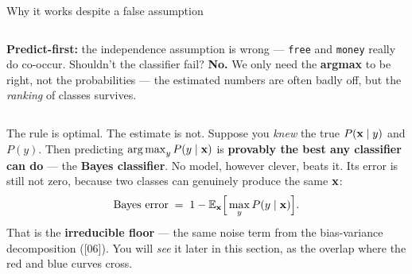 \documentclass[aspectratio=169]{beamer}
\begin{document}
\begin{frame}{Why it works despite a false assumption}
  \begin{columns}[T]
    \textbf{Predict-first:} the independence assumption is wrong --- \texttt{free} and
    \texttt{money} really do co-occur. Shouldn't the classifier fail?
    \pause
    \vskip 4pt
    \textbf{No.} We only need the \textbf{argmax} to be right, not the probabilities --- the
    estimated numbers are often badly off, but the \emph{ranking} of classes survives.
  \end{columns}
  \vfill
\end{frame}

\begin{frame}{The rule is optimal. The estimate is not.}
  Suppose you \emph{knew} the true $P(\mathbf{x}\mid y)$ and $P(y)$. Then predicting
  $\mathop{\mathrm{arg\,max}}_y P(y\mid\mathbf{x})$ is \textbf{provably the best any classifier can do} --- the
  \textbf{Bayes classifier}. No model, however clever, beats it.
  \vskip 3pt
  Its error is still not zero, because two classes can genuinely produce the same $\mathbf{x}$:
  \[
    \text{Bayes error} \;=\; 1 - \mathbb{E}_{\mathbf{x}}\Big[\max_y P(y\mid\mathbf{x})\Big].
  \]
  That is the \textbf{irreducible floor} --- the same noise term from the bias-variance
  decomposition ([06]). You will \emph{see} it later in this section, as the overlap where the red
  and blue curves cross.
  \vfill
\end{frame}
\end{document}
